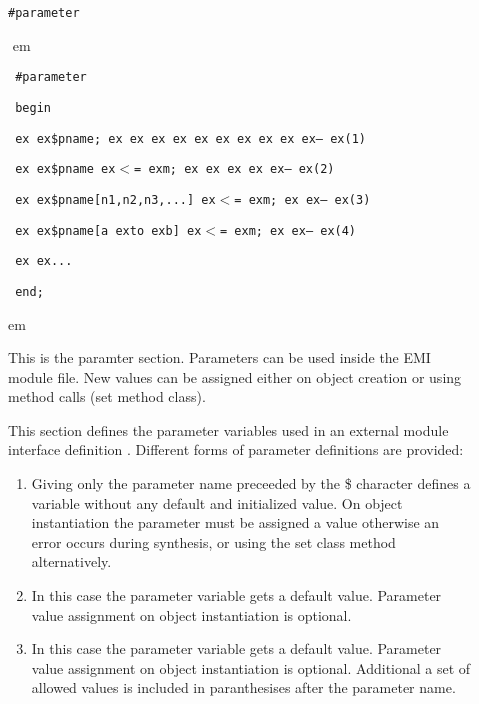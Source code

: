 \documentclass[a4paper,12pt,twoside,english]{article}
\def\s{\hskip 1.15 ex}
\begin{document}
\def\thesubsection{\tocXCIV}
\secII{\label{toclabelXCIV}\thesubsection}
\begin{description}
\item[] $ $\\
{\tt \#parameter}

\item[]
\def\prefskipu{}\def\prefskipo{}\def\prefskipa{}\def\prefskipu{\hskip10pt}\def\prefskipo{\hskip10pt}\def\prefskipa{\hskip20pt}\def\content{
\vskip-5pt{\parindent0pt\parbox{\linewidth}{\tt\smallsize\hskip10pt \#parameter}}
\vskip-5pt{\parindent0pt\parbox{\linewidth}{\tt\smallsize\hskip10pt begin}}
\vskip-5pt{\parindent0pt\parbox{\linewidth}{\tt\smallsize\hskip10pt \s \s \$pname;\s \s \s \s \s \s \s \s \s \s --\s (1)}}
\vskip-5pt{\parindent0pt\parbox{\linewidth}{\tt\smallsize\hskip10pt \s \s \$pname\s $<$=\s m;\s \s \s \s \s --\s (2)}}
\vskip-5pt{\parindent0pt\parbox{\linewidth}{\tt\smallsize\hskip10pt \s \s \$pname{[}n1,n2,n3,...{]}\s $<$=\s m;\s \s --\s (3)}}
\vskip-5pt{\parindent0pt\parbox{\linewidth}{\tt\smallsize\hskip10pt \s \s \$pname{[}a\s to\s b{]}\s $<$=\s m;\s \s --\s (4)}}
\vskip-5pt{\parindent0pt\parbox{\linewidth}{\tt\smallsize\hskip10pt \s \s ...}}
\vskip-5pt{\parindent0pt\parbox{\linewidth}{\tt\smallsize\hskip10pt end;}}
}
$ $
 em
\content
{} em
\item[] $ $\\
This is the paramter section.  Parameters can be used inside the EMI module file. New values can be assigned either on object creation or using method calls
(set method class). 

This section defines the parameter variables used in an external module interface definition .  Different forms of parameter definitions are provided:


\begin{enumerate}
\item Giving only the parameter name preceeded by the \$ character defines a variable without any default and initialized value.  On object instantiation the
parameter must be assigned a value otherwise an error occurs during synthesis, or using the set class method alternatively.

\item In this case the parameter variable gets a default value. Parameter value assignment on object instantiation is optional.

\item In this case the parameter variable gets a default value. Parameter value assignment on object instantiation is optional. Additional  a set  of allowed
values is included in paranthesises after the parameter name. 


\end{enumerate}
\end{description}
\end{document}

